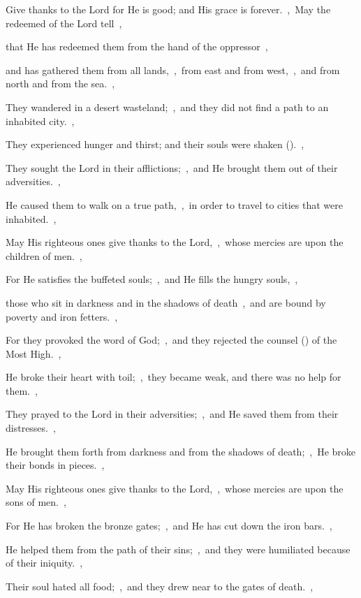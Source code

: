 \documentclass[12pt,twoside,a5paper]{article}
\begin{document}
\begin{normalparskip}
  Give thanks to the Lord for He is good; and His grace is forever.~\sep\ May the redeemed of the Lord tell~\sep


  that He has redeemed them from the hand of the oppressor~\sep

  and has gathered them from all lands,~\sep\ from east and from west,~\sep\ and from north and from the sea.~\sep

  They wandered in a desert wasteland;~\sep\ and they did not find a path to an inhabited city.~\sep

  They experienced hunger and thirst; and their souls were shaken ().~\sep

  They sought the Lord in their afflictions;~\sep\ and He brought them out of their adversities.~\sep

  He caused them to walk on a true path,~\sep\ in order to travel to cities that were inhabited.~\sep

  May His righteous ones give thanks to the Lord,~\sep\ whose mercies are upon the children of men.~\sep

  For He satisfies the buffeted souls;~\sep\ and He fills the hungry souls,~\sep

  those who sit in darkness and in the shadows of death~\sep\ and are bound by poverty and iron fetters.~\sep

  For they provoked the word of God;~\sep\ and they rejected the counsel () of the Most High.~\sep

  He broke their heart with toil;~\sep\ they became weak, and there was no help for them.~\sep

  They prayed to the Lord in their adversities;~\sep\ and He saved them from their distresses.~\sep

  He brought them forth from darkness and from the shadows of death;~\sep\ He broke their bonds in pieces.~\sep

  May His righteous ones give thanks to the Lord,~\sep\ whose mercies are upon the sons of men.~\sep

  For He has broken the bronze gates;~\sep\ and He has cut down the iron bars.~\sep

  He helped them from the path of their sins;~\sep\ and they were humiliated because of their iniquity.~\sep

  Their soul hated all food;~\sep\ and they drew near to the gates of death.~\sep


\end{normalparskip}
\end{document}

